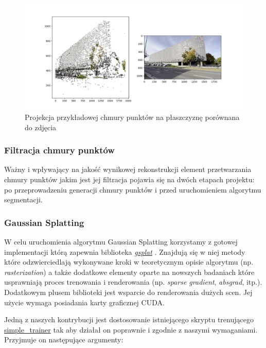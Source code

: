 \begin{figure}[!ht]
  \centering
  \includegraphics[width=0.9\linewidth]{img/sfm_projection.png}
  \caption{Projekcja przykładowej chmury punktów na płaszczyznę porównana do zdjęcia}
\end{figure}

\subsubsection{Filtracja chmury punktów}
Ważny i wpływający na jakość wynikowej rekonstrukcji element przetwarzania chmury punktów jakim jest jej filtracja pojawia się na dwóch etapach projektu: po przeprowadzeniu generacji chmury punktów i przed uruchomieniem algorytmu segmentacji. 

\subsubsection{Gaussian Splatting}
W celu uruchomienia algorytmu Gaussian Splatting korzystamy z gotowej implementacji którą 
zapewnia biblioteka \href{https://docs.gsplat.studio/main/index.html}{\textit{gsplat}} \cite{ye2024gsplatopensourcelibrarygaussian}. Znajdują się w niej metody które odzwierciedlają wykonywane kroki w teoretycznym opisie algorytmu (np. \textit{rasterization}) a także dodatkowe elementy oparte na nowszych badaniach które usprawniają proces trenowania i renderowania (np. \textit{sparse gradient}, \textit{absgrad}, itp.). Dodatkowym plusem biblioteki jest wsparcie do renderowania dużych scen. Jej użycie wymaga posiadania karty graficznej CUDA.  

Jedną z naszych kontrybucji jest dostosowanie istniejącego skryptu trenującego \href{https://github.com/nerfstudio-project/gsplat/blob/main/examples/simple_trainer.py}{simple\_trainer} tak aby działał on poprawnie i zgodnie z naszymi wymaganiami. Przyjmuje on następujące argumenty:

